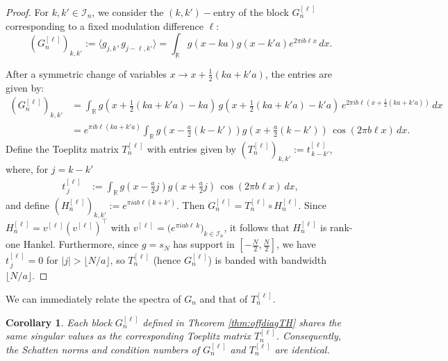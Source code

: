 \documentclass{article}
\newtheorem{corollary}{Corollary}[theorem]
\begin{document}
\begin{proof}
For $k,k'\in \mathcal{I}_n$, we consider the $(k,k')-$entry of the block \(G_n^{[\ell]}\) corresponding to a fixed modulation difference $\ell$:
\[
(G_n^{[\ell]})_{k,k'}:=\langle g_{j,k}, g_{j-\ell,k'} \rangle = \int_{\mathbb{R}} g(x - {ka}) g(x - {k'a}) e^{2\pi i b \ell x} \, dx.
\]

After a symmetric change of variables \(x \to  x + \tfrac{1}{2}({ka} + {k'a})\), the entries are given by:
\begin{align*}
(G_n^{[\ell]})_{k,k'}
&= \int_{\mathbb{R}} g(x + \tfrac{1}{2}({ka} + {k'a}) - {ka})\, g(x + \tfrac{1}{2}({ka} + {k'a}) - {k'a})\, e^{2\pi i b \ell (x + \tfrac{1}{2}({ka} + {k'a}))} \, dx \\
&=e^{\pi i b\ell ({ka} + {k'a}) }\int_{\mathbb{R}} g\left(x - \tfrac{a}{2} (k-k')\right) g\left(x + \tfrac{a}{2} (k-k')\right)\, \cos(2\pi b\ell x) \, dx.
\end{align*}
Define the Toeplitz matrix $T_n^{[\ell]}$ with entries given by $(T_n^{[\ell]})_{k,k'}:= t^{[\ell]}_{\,k-k'}$, where, for $j=k-k'$
\begin{align}
    t^{[\ell]}_{\,j} &:= \int_{\mathbb{R}} g\left(x - \tfrac{a}{2} j\right) g\left(x + \tfrac{a}{2} j\right)\, \cos(2\pi b\ell x) \, dx, \label{eq:tjl}
\end{align}
and define $(H_n^{[\ell]})_{k,k'}:=e^{\pi i a b \ell (k+k')}$. Then $G_n^{[\ell]}=T_n^{[\ell]}\circ H_n^{[\ell]}$. Since $H_n^{[\ell]}=v^{[\ell]}(v^{[\ell]})^{\!\top}$ with
$v^{[\ell]}=\big(e^{\pi i a b \ell\,k}\big)_{k\in\mathcal{I}_n}$, it follows that $H_n^{[\ell]}$ is rank-one Hankel. Furthermore, since $g=s_N$ has support in $[-\frac{N}{2},\frac{N}{2}]$, we have $t^{[\ell]}_{\,j}=0$ for $|j|>\lfloor N/a\rfloor$, so
$T_n^{[\ell]}$ (hence $G_n^{[\ell]}$) is banded with bandwidth $\lfloor N/a\rfloor$.
\end{proof}

We can immediately relate the spectra of $G_n$ and that of $T_n^{[\ell]}$. 


\begin{corollary}\label{cor:specgntnl}
Each block $G_n^{[\ell]}$ defined in Theorem \ref{thm:offdiagTH} shares the same singular values as the corresponding Toeplitz matrix $T_n^{[\ell]}$. Consequently, the Schatten norms and condition numbers of $G_n^{[\ell]}$ and $T_n^{[\ell]}$ are identical.
\end{corollary}
\end{document}
